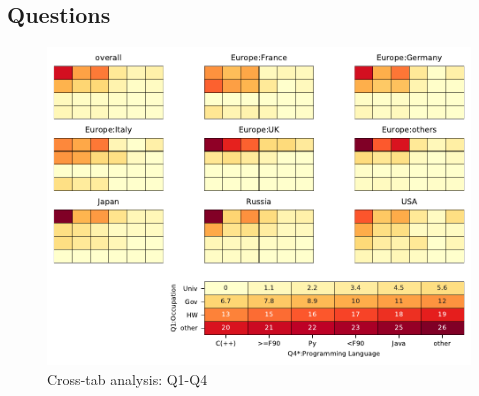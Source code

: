 
\subsection{Questions}


\begin{figure}
\begin{center}
\includegraphics[width=12cm]{../pdfs/Q1-Q4.pdf}
\caption{Cross-tab analysis: Q1-Q4}
\label{fig:Q1-Q4}
\end{center}
\end{figure}
